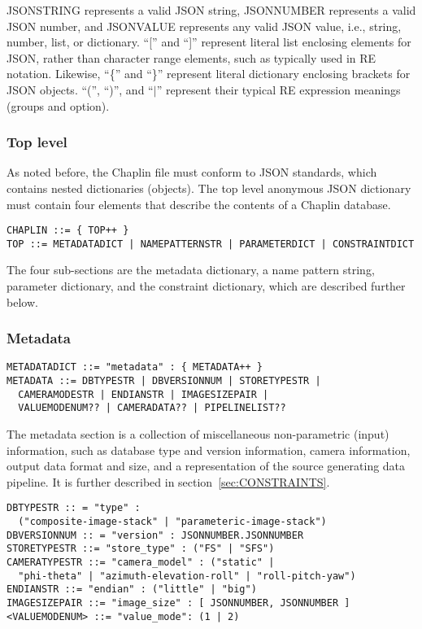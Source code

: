 JSONSTRING represents a valid JSON string, JSONNUMBER
represents a valid JSON number, and JSONVALUE
represents any valid JSON value, i.e., string, number, list, or dictionary.
``['' and ``]'' represent literal list enclosing elements for JSON,
rather than character range elements, such as typically used in 
RE notation. Likewise, ``\{'' and ``\}'' represent literal dictionary
enclosing brackets for JSON objects. 
``('', ``)'', and ``$|$'' represent
their typical RE expression meanings (groups and option).

\subsubsection{Top level}

As noted before, the Chaplin file must conform to JSON standards,
which contains nested dictionaries (objects). 
The top level anonymous JSON dictionary
must contain four elements that describe the contents
of a Chaplin database.

\begin{verbatim}
CHAPLIN ::= { TOP++ }
TOP ::= METADATADICT | NAMEPATTERNSTR | PARAMETERDICT | CONSTRAINTDICT 
\end{verbatim}

The four sub-sections are the metadata dictionary,
a name pattern string, parameter dictionary, and the constraint dictionary,
which are described further below.

\subsubsection{Metadata}

\begin{verbatim}
METADATADICT ::= "metadata" : { METADATA++ }
METADATA ::= DBTYPESTR | DBVERSIONNUM | STORETYPESTR | 
  CAMERAMODESTR | ENDIANSTR | IMAGESIZEPAIR |
  VALUEMODENUM?? | CAMERADATA?? | PIPELINELIST??  
\end{verbatim}

The metadata section is a collection of miscellaneous non-parametric
(input) information, such as database type and
version information, camera
information, output data format and size,
and a representation of the source generating 
data pipeline. It is further
described in section~\ref{sec:CONSTRAINTS}.

\begin{verbatim}
DBTYPESTR :: = "type" : 
  ("composite-image-stack" | "parameteric-image-stack")
DBVERSIONNUM :: = "version" : JSONNUMBER.JSONNUMBER
STORETYPESTR ::= "store_type" : ("FS" | "SFS")
CAMERATYPESTR ::= "camera_model" : ("static" | 
  "phi-theta" | "azimuth-elevation-roll" | "roll-pitch-yaw")
ENDIANSTR ::= "endian" : ("little" | "big")
IMAGESIZEPAIR ::= "image_size" : [ JSONNUMBER, JSONNUMBER ]
<VALUEMODENUM> ::= "value_mode": (1 | 2)
\end{verbatim}

